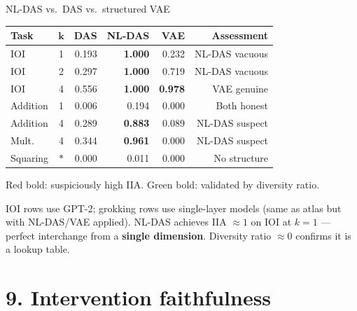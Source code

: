 \documentclass[aspectratio=169,11pt]{beamer}
\begin{document}
\begin{frame}{NL-DAS vs.\ DAS vs.\ structured VAE}

\centering
{\small\setlength{\tabcolsep}{4pt}
\begin{tabular}{lc rrrr}
\toprule
\textbf{Task} & $\boldsymbol{k}$ & \textbf{DAS} & \textbf{NL-DAS} & \textbf{VAE} & \textbf{Assessment} \\
\midrule
IOI & 1 & 0.193 & \textcolor{fail}{\textbf{1.000}} & 0.232 & NL-DAS vacuous \\
IOI & 2 & 0.297 & \textcolor{fail}{\textbf{1.000}} & 0.719 & NL-DAS vacuous \\
IOI & 4 & 0.556 & \textcolor{fail}{\textbf{1.000}} & \textcolor{pass}{\textbf{0.978}} & VAE genuine \\
Addition & 1 & 0.006 & 0.194 & 0.000 & Both honest \\
Addition & 4 & 0.289 & \textcolor{fail}{\textbf{0.883}} & 0.089 & NL-DAS suspect \\
Mult. & 4 & 0.344 & \textcolor{fail}{\textbf{0.961}} & 0.000 & NL-DAS suspect \\
Squaring & $*$ & 0.000 & 0.011 & 0.000 & No structure \\
\bottomrule
\end{tabular}}

\vspace{0.5em}
{\small \textcolor{fail}{Red bold}: suspiciously high IIA. \textcolor{pass}{Green bold}: validated by diversity ratio.}

\vspace{0.3em}
{\small IOI rows use GPT-2; grokking rows use single-layer models (same as atlas but with NL-DAS/VAE applied). NL-DAS achieves IIA $\approx 1$ on IOI at $k=1$ --- perfect interchange from a \textbf{single dimension}. Diversity ratio $\approx 0$ confirms it is a lookup table.}
\end{frame}

\section{9. Intervention faithfulness}
\end{document}
